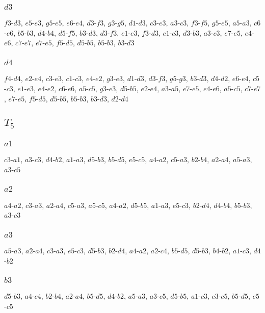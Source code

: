 \documentclass{article}
\begin{document}
\subsubsection{\large $d3$}
$f3$-$d3$, $e5$-$e3$, $g5$-$e5$, $e6$-$e4$, $d3$-$f3$, $g3$-$g5$, $d1$-$d3$, $c3$-$e3$, $a3$-$c3$, $f3$-$f5$, $g5$-$e5$, $a5$-$a3$, $c6$-$e6$, $b5$-$b3$, $d4$-$b4$, $d5$-$f5$, $b3$-$d3$, $d3$-$f3$, $e1$-$e3$, $f3$-$d3$, $c1$-$c3$, $d3$-$b3$, $a3$-$c3$, $e7$-$e5$, $e4$-$e6$, $c7$-$e7$, $e7$-$e5$, $f5$-$d5$, $d5$-$b5$, $b5$-$b3$, $b3$-$d3$

\subsubsection{\large $d4$}
$f4$-$d4$, $e2$-$e4$, $c3$-$e3$, $c1$-$c3$, $e4$-$e2$, $g3$-$e3$, $d1$-$d3$, $d3$-$f3$, $g5$-$g3$, $b3$-$d3$, $d4$-$d2$, $e6$-$e4$, $c5$-$c3$, $e1$-$e3$, $e4$-$e2$, $c6$-$e6$, $a5$-$c5$, $g3$-$e3$, $d5$-$b5$, $e2$-$e4$, $a3$-$a5$, $e7$-$e5$, $e4$-$e6$, $a5$-$c5$, $c7$-$e7$, $e7$-$e5$, $f5$-$d5$, $d5$-$b5$, $b5$-$b3$, $b3$-$d3$, $d2$-$d4$

\subsection{$T_5$}
\subsubsection{\large $a1$}
$c3$-$a1$, $a3$-$c3$, $d4$-$b2$, $a1$-$a3$, $d5$-$b3$, $b5$-$d5$, $e5$-$c5$, $a4$-$a2$, $c5$-$a3$, $b2$-$b4$, $a2$-$a4$, $a5$-$a3$, $a3$-$c5$

\subsubsection{\large $a2$}
$a4$-$a2$, $c3$-$a3$, $a2$-$a4$, $c5$-$a3$, $a5$-$c5$, $a4$-$a2$, $d5$-$b5$, $a1$-$a3$, $e5$-$c3$, $b2$-$d4$, $d4$-$b4$, $b5$-$b3$, $a3$-$c3$

\subsubsection{\large $a3$}
$a5$-$a3$, $a2$-$a4$, $c3$-$a3$, $e5$-$c3$, $d5$-$b3$, $b2$-$d4$, $a4$-$a2$, $a2$-$c4$, $b5$-$d5$, $d5$-$b3$, $b4$-$b2$, $a1$-$c3$, $d4$-$b2$

\subsubsection{\large $b3$}
$d5$-$b3$, $a4$-$c4$, $b2$-$b4$, $a2$-$a4$, $b5$-$d5$, $d4$-$b2$, $a5$-$a3$, $a3$-$c5$, $d5$-$b5$, $a1$-$c3$, $c3$-$c5$, $b5$-$d5$, $e5$-$c5$
\end{document}

